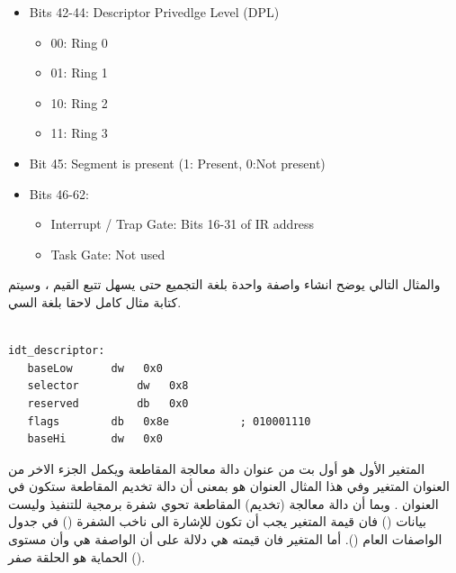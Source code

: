 \documentclass[document.tex]{subfiles}
\begin{document}
\begin{english}
\begin{itemize}
\begin{itemize}
\end{itemize}

\item Bits 42-44: Descriptor Privedlge Level (DPL)
\begin{itemize}
\item 00: Ring 0
\item 01: Ring 1
\item 10: Ring 2
\item 11: Ring 3
\end{itemize}

\item Bit 45: Segment is present (1: Present, 0:Not present)
\item Bits 46-62: 
\begin{itemize}
\item Interrupt / Trap Gate: Bits 16-31 of IR address
\item Task Gate: Not used
\end{itemize}

\end{itemize}
\end{english}

والمثال التالي يوضح انشاء واصفة واحدة بلغة التجميع حتى يسهل تتبع القيم ، وسيتم كتابة مثال كامل لاحقا بلغة السي.

\begin{english}

\lstset{numberstyle=\tiny,numbersep=5pt,tabsize=2,extendedchars=true,breaklines=true,frame=b,showspaces=false, showtabs=false,xleftmargin=10pt,framexleftmargin=10pt,framexrightmargin=5pt,framexbottommargin=4pt,showstringspaces=false,language=[x86masm]Assembler}


\begin{lstlisting}[label=idt_desc,caption=\en{Example of interrupt descriptor}]

idt_descriptor:
   baseLow     	dw   0x0 
   selector      	dw   0x8
   reserved     	db   0x0 
   flags      	db   0x8e           ; 010001110
   baseHi      	dw   0x0

\end{lstlisting}
\end{english}

المتغير الأول  هو أول  بت من عنوان دالة معالجة المقاطعة  ويكمل الجزء الاخر من العنوان المتغير  وفي هذا المثال العنوان هو  بمعنى أن دالة تخديم المقاطعة ستكون في العنوان .  وبما أن دالة معالجة (تخديم) المقاطعة تحوي شفرة برمجية للتنفيذ وليست بيانات () فان قيمة المتغير  يجب أن تكون  للإشارة الى ناخب الشفرة () في جدول الواصفات العام ().  أما المتغير  فان قيمته هي  دلالة على أن الواصفة هي  وأن مستوى الحماية هو الحلقة صفر ().
\end{document}
